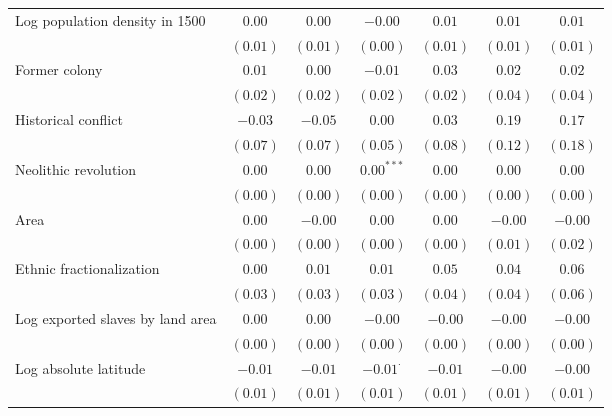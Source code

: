 \begin{sidewaystable}
\begin{center}
{\begin{tabular}{l c c c c c c}
Log population density in 1500   & $0.00$       & $0.00$       & $-0.00$         & $0.01$      & $0.01$       & $0.01$      \\
                                 & $(0.01)$     & $(0.01)$     & $(0.00)$        & $(0.01)$    & $(0.01)$     & $(0.01)$    \\
Former colony                    & $0.01$       & $0.00$       & $-0.01$         & $0.03$      & $0.02$       & $0.02$      \\
                                 & $(0.02)$     & $(0.02)$     & $(0.02)$        & $(0.02)$    & $(0.04)$     & $(0.04)$    \\
Historical conflict              & $-0.03$      & $-0.05$      & $0.00$          & $0.03$      & $0.19$       & $0.17$      \\
                                 & $(0.07)$     & $(0.07)$     & $(0.05)$        & $(0.08)$    & $(0.12)$     & $(0.18)$    \\
Neolithic revolution             & $0.00$       & $0.00$       & $0.00^{***}$    & $0.00$      & $0.00$       & $0.00$      \\
                                 & $(0.00)$     & $(0.00)$     & $(0.00)$        & $(0.00)$    & $(0.00)$     & $(0.00)$    \\
Area                             & $0.00$       & $-0.00$      & $0.00$          & $0.00$      & $-0.00$      & $-0.00$     \\
                                 & $(0.00)$     & $(0.00)$     & $(0.00)$        & $(0.00)$    & $(0.01)$     & $(0.02)$    \\
Ethnic fractionalization         & $0.00$       & $0.01$       & $0.01$          & $0.05$      & $0.04$       & $0.06$      \\
                                 & $(0.03)$     & $(0.03)$     & $(0.03)$        & $(0.04)$    & $(0.04)$     & $(0.06)$    \\
Log exported slaves by land area & $0.00$       & $0.00$       & $-0.00$         & $-0.00$     & $-0.00$      & $-0.00$     \\
                                 & $(0.00)$     & $(0.00)$     & $(0.00)$        & $(0.00)$    & $(0.00)$     & $(0.00)$    \\
Log absolute latitude            & $-0.01$      & $-0.01$      & $-0.01^{\cdot}$ & $-0.01$     & $-0.00$      & $-0.00$     \\
                                 & $(0.01)$     & $(0.01)$     & $(0.01)$        & $(0.01)$    & $(0.01)$     & $(0.01)$    \\

\end{tabular}}
\end{center}
\end{sidewaystable}
